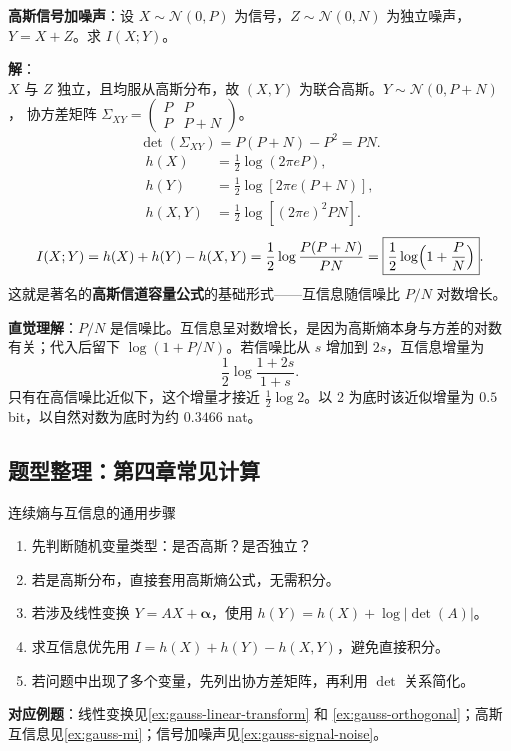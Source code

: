 \begin{example}
\label{ex:gauss-signal-noise}
\textbf{高斯信号加噪声}：设 $X\sim\mathcal{N}(0,P)$ 为信号，$Z\sim\mathcal{N}(0,N)$ 为独立噪声，$Y=X+Z$。求 $I(X;Y)$。

\noindent \textbf{解}：\\[2pt]
$X$ 与 $Z$ 独立，且均服从高斯分布，故 $(X,Y)$ 为联合高斯。$Y\sim\mathcal{N}(0,P+N)$，
协方差矩阵 $\Sigma_{XY}=\begin{pmatrix}P&P\\P&P+N\end{pmatrix}$。
\[
\det(\Sigma_{XY})=P(P+N)-P^2=PN.
\]
\begin{align*}
h(X)  &= \frac{1}{2}\log(2\pi eP),\\
h(Y)  &= \frac{1}{2}\log[2\pi e(P+N)],\\
h(X,Y) &= \frac{1}{2}\log[(2\pi e)^2 PN].
\end{align*}
\[
I(X;Y)=h(X)+h(Y)-h(X,Y)=\frac{1}{2}\log\frac{P(P+N)}{PN}
      =\boxed{\frac{1}{2}\log\Bigl(1+\frac{P}{N}\Bigr)}.
\]
这就是著名的\textbf{高斯信道容量公式}的基础形式——互信息随信噪比 $P/N$ 对数增长。

\noindent \textbf{直觉理解}：$P/N$ 是信噪比。互信息呈对数增长，是因为高斯熵本身与方差的对数有关；代入后留下 $\log(1+P/N)$。若信噪比从 $s$ 增加到 $2s$，互信息增量为
\[
\frac12\log\frac{1+2s}{1+s}.
\]
只有在高信噪比近似下，这个增量才接近 $\frac12\log 2$。以 2 为底时该近似增量为 $0.5$ bit，以自然对数为底时为约 $0.3466$ nat。
\end{example}

\subsection{题型整理：第四章常见计算}

\begin{methodBox}{连续熵与互信息的通用步骤}
\begin{enumerate}
  \item 先判断随机变量类型：是否高斯？是否独立？
  \item 若是高斯分布，直接套用高斯熵公式，无需积分。
  \item 若涉及线性变换 $Y=AX+\bm{\alpha}$，使用 $h(Y)=h(X)+\log|\det(A)|$。
  \item 求互信息优先用 $I=h(X)+h(Y)-h(X,Y)$，避免直接积分。
  \item 若问题中出现了多个变量，先列出协方差矩阵，再利用 $\det$ 关系简化。
\end{enumerate}
\vspace{2pt}
\noindent \textbf{对应例题}：线性变换见\cref{ex:gauss-linear-transform} 和 \cref{ex:gauss-orthogonal}；高斯互信息见\cref{ex:gauss-mi}；信号加噪声见\cref{ex:gauss-signal-noise}。
\end{methodBox}

